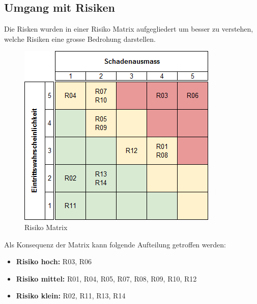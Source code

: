 \subsection{Umgang mit Risiken}
Die Risken wurden in einer Risiko Matrix aufgegliedert um besser zu verstehen, welche Risiken eine grosse Bedrohung darstellen.

\begin{figure}[ht]
	\centering
	\includegraphics[scale=0.7]{images/risk_result.png}
	\caption{Risiko Matrix}
	\label{Risk result}
\end{figure}

Als Konsequenz der Matrix kann folgende Aufteilung getroffen werden:
\begin{itemize}
	\item{\textbf{Risiko hoch:} R03, R06}
	\item{\textbf{Risiko mittel:} R01, R04, R05, R07, R08, R09, R10, R12 }
	\item{\textbf{Risiko klein:} R02, R11, R13, R14}
\end{itemize}

